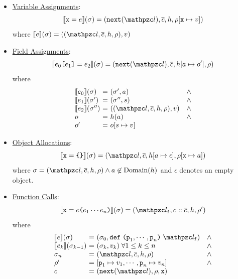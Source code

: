 \begin{itemize}
  \item \underline{Variable Assignments}:
    \[
      \sem{\varx = \expr}(\st) =
      (\getnext(\lab), \ctxts, \heap, \env[\varx \mapsto \val])
    \]
    where $\sem{\expr}(\st) = ((\lab, \ctxts, \heap, \env), \val)$

  \item \underline{Field Assignments}:
    \[
      \sem{\expr_0 \kwsl \expr_1 \kwsr = \expr_2}(\st) =
      (\getnext(\lab), \ctxts, \heap[\addr \mapsto \obj'], \env)
    \]
    where
    \[
      \begin{array}{l@{~}c@{~}ll}
        \sem{\expr_0}(\st) &=& (\st', \addr) &\wedge\\
        \sem{\expr_1}(\st') &=& (\st'', \str) &\wedge\\
        \sem{\expr_2}(\st'') &=& ((\lab, \ctxts, \heap, \env), \val) &\wedge\\
        \obj &=& \heap(\addr) &\wedge\\
        \obj' &=& \obj[\str \mapsto \val]\\
      \end{array}
    \]

  \item \underline{Object Allocations}:
    \[
      \sem{\varx = \kwcl \kwcr}(\st) =
      (\lab, \ctxts, \heap[\addr \mapsto \epsilon], \env[\varx \mapsto
      \addr])
    \]
    where $\st = (\lab, \ctxts, \heap, \env) \wedge \addr \not\in
    \text{Domain}(\heap)$ and $\epsilon$ denotes an empty object.

  \item \underline{Function Calls}:
    \[
      \sem{\varx = \expr \kwrl \expr_1 \cdots \expr_n \kwrr}(\st) =
      (\lab_\varf, \ctxt :: \ctxts, \heap, \env')
    \]
    where
    \[
      \begin{array}{l@{~}c@{~}ll}
        \sem{\expr}(\st) &=& (\st_0, \kwdef \; \kwrl \varp_1, \cdots, \varp_n
        \kwrr \; \lab_\varf) &\wedge\\
        \sem{\expr_k}(\st_{k-1}) &=& (\st_k, \val_k) \; \forall 1 \leq k \leq n
        &\wedge\\
        \st_n &=& (\lab, \ctxts, \heap, \env) &\wedge\\
        \env' &=& [\varp_1 \mapsto \val_1, \cdots, \varp_n \mapsto \val_n]
        &\wedge\\
        \ctxt &=& (\getnext(\lab), \env, \varx)\\
      \end{array}
    \]


\end{itemize}
